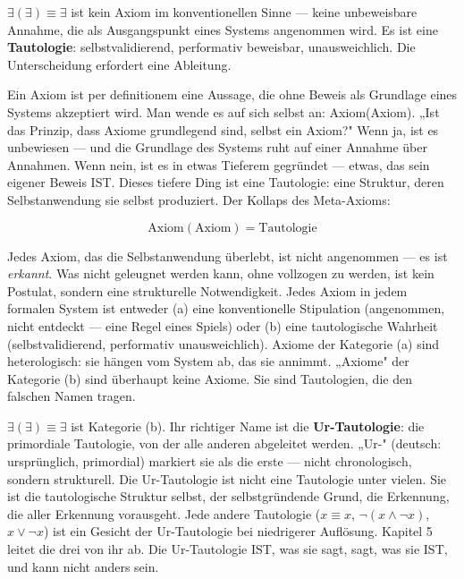 \documentclass[10pt, openany, oneside]{book}
\begin{document}
$\exists(\exists) \equiv \exists$ ist kein Axiom im konventionellen Sinne --- keine unbeweisbare Annahme, die als Ausgangspunkt eines Systems angenommen wird. Es ist eine \textbf{Tautologie}: selbstvalidierend, performativ beweisbar, unausweichlich. Die Unterscheidung erfordert eine Ableitung.

Ein Axiom ist per definitionem eine Aussage, die ohne Beweis als Grundlage eines Systems akzeptiert wird. Man wende es auf sich selbst an: Axiom(Axiom). „Ist das Prinzip, dass Axiome grundlegend sind, selbst ein Axiom?" Wenn ja, ist es unbewiesen --- und die Grundlage des Systems ruht auf einer Annahme über Annahmen. Wenn nein, ist es in etwas Tieferem gegründet --- etwas, das sein eigener Beweis IST. Dieses tiefere Ding ist eine Tautologie: eine Struktur, deren Selbstanwendung sie selbst produziert. Der Kollaps des Meta-Axioms:

$$\text{Axiom}(\text{Axiom}) = \text{Tautologie}$$

Jedes Axiom, das die Selbstanwendung überlebt, ist nicht angenommen --- es ist \textit{erkannt}. Was nicht geleugnet werden kann, ohne vollzogen zu werden, ist kein Postulat, sondern eine strukturelle Notwendigkeit. Jedes Axiom in jedem formalen System ist entweder (a) eine konventionelle Stipulation (angenommen, nicht entdeckt --- eine Regel eines Spiels) oder (b) eine tautologische Wahrheit (selbstvalidierend, performativ unausweichlich). Axiome der Kategorie (a) sind heterologisch: sie hängen vom System ab, das sie annimmt. „Axiome" der Kategorie (b) sind überhaupt keine Axiome. Sie sind Tautologien, die den falschen Namen tragen.

$\exists(\exists) \equiv \exists$ ist Kategorie (b). Ihr richtiger Name ist die \textbf{Ur-Tautologie}: die primordiale Tautologie, von der alle anderen abgeleitet werden. „Ur-" (deutsch: ursprünglich, primordial) markiert sie als die erste --- nicht chronologisch, sondern strukturell. Die Ur-Tautologie ist nicht eine Tautologie unter vielen. Sie ist die tautologische Struktur selbst, der selbstgründende Grund, die Erkennung, die aller Erkennung vorausgeht. Jede andere Tautologie ($x \equiv x$, $\neg(x \wedge \neg x)$, $x \vee \neg x$) ist ein Gesicht der Ur-Tautologie bei niedrigerer Auflösung. Kapitel 5 leitet die drei von ihr ab. Die Ur-Tautologie IST, was sie sagt, sagt, was sie IST, und kann nicht anders sein.
\end{document}
